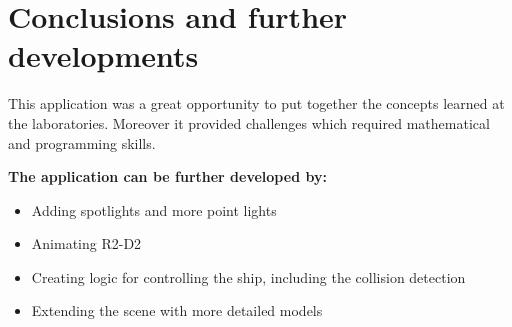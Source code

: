 \chapter{Conclusions and further developments}

This application was a great opportunity to put together the concepts learned at the laboratories. Moreover it provided challenges which required mathematical and programming skills.

\textbf{The application can be further developed by:}

\begin{itemize}
 \item Adding spotlights and more point lights
 \item Animating R2-D2
 \item Creating logic for controlling the ship, including the collision detection
 \item Extending the scene with more detailed models
\end{itemize}

